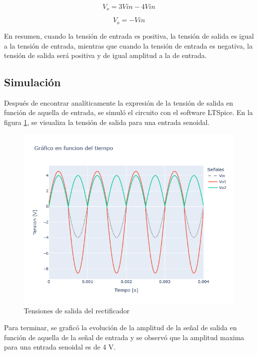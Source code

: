 \[V_o = 3V{in} - 4V{in}\]

\[V_o = - V{in} \]

En resumen, cuando la tensión de entrada es positiva, la tensión de salida es igual a la tensión de entrada, mientras que cuando la tensión de entrada es negativa, la tensión de salida será positiva y de igual amplitud a la de entrada.


\subsection{Simulación}
Después de encontrar analíticamente la expresión de la tensión de salida en función de aquella de entrada, se simuló el circuito con el software LTSpice. En la figura \ref{fig:TP1_3_Vo1_Vo2_Vin_vs_t}, se visualiza la tensión de salida para una entrada senoidal. 

\begin{figure}[H]
    \centering
    \includegraphics[width=0.9\linewidth]{Secciones/Circuito3/TP1_3_Vo1_Vo2_Vin_vs_t.png}
    \caption{Tensiones de salida del rectificador}
    \label{fig:TP1_3_Vo1_Vo2_Vin_vs_t}
\end{figure}

Para terminar, se graficó la evolución de la amplitud de la señal de salida en función de aquella de la señal de entrada y se observó que la amplitud maxima para una entrada senoidal es de 4 V.

